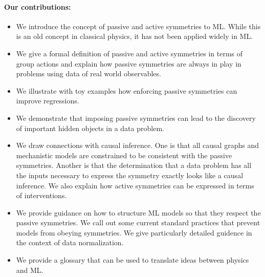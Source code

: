 \documentclass[preprint]{article} %
\begin{document}
\paragraph{Our contributions:}
\begin{itemize}
\item
We introduce the concept of passive and active symmetries to ML.
While this is an old concept in classical physics, it has not been applied widely in ML.
\item
We give a formal definition of passive and active symmetries in terms of group actions and explain how passive symmetries are always in play in problems using data of real world observables.
\item
We illustrate with toy examples how enforcing passive symmetries can improve regressions. 
\item
We demonstrate that imposing passive symmetries can lead to the discovery of important hidden objects in a data problem.
\item
We draw connections with causal inference.
One is that all causal graphs and mechanistic models are constrained to be consistent with the passive symmetries.
Another is that the determination that a data problem has all the inputs necessary to express the symmetry exactly looks like a causal inference. 
We also explain how active symmetries can be expressed in terms of interventions.
\item 
We provide guidance on how to structure ML models so that they respect the passive symmetries. We call out some current standard practices that prevent models from obeying symmetries.
We give particularly detailed guidence in the context of data normalization.
\item
We provide a glossary that can be used to translate ideas between physics and ML. 
\end{itemize}
\end{document}
